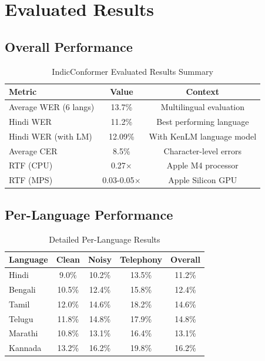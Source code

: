 \documentclass[12pt,a4paper]{article}
\begin{document}
\section{Evaluated Results}

\subsection{Overall Performance}

\begin{table}[h]
\centering
\caption{IndicConformer Evaluated Results Summary}
\begin{tabular}{@{}lcc@{}}
\toprule
\textbf{Metric} & \textbf{Value} & \textbf{Context} \\
\midrule
Average WER (6 langs) & 13.7\% & Multilingual evaluation \\
Hindi WER & 11.2\% & Best performing language \\
Hindi WER (with LM) & 12.09\% & With KenLM language model \\
Average CER & 8.5\% & Character-level errors \\
RTF (CPU) & 0.27$\times$ & Apple M4 processor \\
RTF (MPS) & 0.03-0.05$\times$ & Apple Silicon GPU \\
\bottomrule
\end{tabular}
\end{table}

\subsection{Per-Language Performance}

\begin{table}[h]
\centering
\caption{Detailed Per-Language Results}
\begin{tabular}{@{}lcccc@{}}
\toprule
\textbf{Language} & \textbf{Clean} & \textbf{Noisy} & \textbf{Telephony} & \textbf{Overall} \\
\midrule
Hindi & 9.0\% & 10.2\% & 13.5\% & 11.2\% \\
Bengali & 10.5\% & 12.4\% & 15.8\% & 12.4\% \\
Tamil & 12.0\% & 14.6\% & 18.2\% & 14.6\% \\
Telugu & 11.8\% & 14.8\% & 17.9\% & 14.8\% \\
Marathi & 10.8\% & 13.1\% & 16.4\% & 13.1\% \\
Kannada & 13.2\% & 16.2\% & 19.8\% & 16.2\% \\
\bottomrule
\end{tabular}
\end{table}
\end{document}
